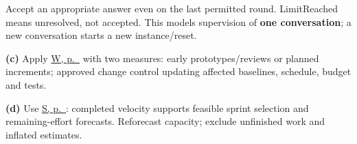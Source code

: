 \begin{studycolumns}
\vspace{0pt}



Accept an appropriate answer even on the last permitted round. LimitReached means unresolved, not accepted. This models supervision of \textbf{one conversation}; a new conversation starts a new instance/\allowbreak{}reset.

\textbf{(c)} Apply \hyperref[answer-waterfall]{W, p.\ \pageref{answer-waterfall}} with two measures: early prototypes/reviews or planned increments; approved change control updating affected baselines, schedule, budget and tests.

\textbf{(d)} Use \hyperref[answer-scrum]{S, p.\ \pageref{answer-scrum}}: completed velocity supports feasible sprint selection and remaining-effort forecasts. Reforecast capacity; exclude unfinished work and inflated estimates.
\end{studycolumns}

